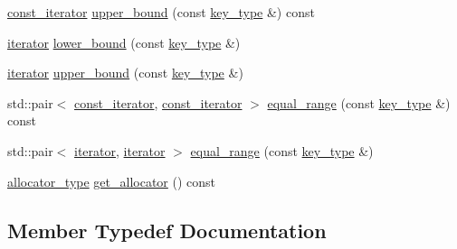 \begin{DoxyCompactItemize}
\item 
\hyperlink{classnifty_1_1container_1_1FlatSet_a0f4cd26da060859b18742abfd534aa24}{const\+\_\+iterator} \hyperlink{classnifty_1_1container_1_1FlatSet_a24a2ea880e091cadf42459203fa1b933}{upper\+\_\+bound} (const \hyperlink{classnifty_1_1container_1_1FlatSet_a0101a4574052389646be8d9bf092a949}{key\+\_\+type} \&) const 
\item 
\hyperlink{classnifty_1_1container_1_1FlatSet_a9c7fd20cd6b1878ccb8a7e068072c795}{iterator} \hyperlink{classnifty_1_1container_1_1FlatSet_a824de5a2d87a1d938af264a8e06c4a2a}{lower\+\_\+bound} (const \hyperlink{classnifty_1_1container_1_1FlatSet_a0101a4574052389646be8d9bf092a949}{key\+\_\+type} \&)
\item 
\hyperlink{classnifty_1_1container_1_1FlatSet_a9c7fd20cd6b1878ccb8a7e068072c795}{iterator} \hyperlink{classnifty_1_1container_1_1FlatSet_ad29a9db87f15925db9d5569482720b5b}{upper\+\_\+bound} (const \hyperlink{classnifty_1_1container_1_1FlatSet_a0101a4574052389646be8d9bf092a949}{key\+\_\+type} \&)
\item 
std\+::pair$<$ \hyperlink{classnifty_1_1container_1_1FlatSet_a0f4cd26da060859b18742abfd534aa24}{const\+\_\+iterator}, \hyperlink{classnifty_1_1container_1_1FlatSet_a0f4cd26da060859b18742abfd534aa24}{const\+\_\+iterator} $>$ \hyperlink{classnifty_1_1container_1_1FlatSet_a93b713a32fc6dd6e1fbf69b34849b314}{equal\+\_\+range} (const \hyperlink{classnifty_1_1container_1_1FlatSet_a0101a4574052389646be8d9bf092a949}{key\+\_\+type} \&) const 
\item 
std\+::pair$<$ \hyperlink{classnifty_1_1container_1_1FlatSet_a9c7fd20cd6b1878ccb8a7e068072c795}{iterator}, \hyperlink{classnifty_1_1container_1_1FlatSet_a9c7fd20cd6b1878ccb8a7e068072c795}{iterator} $>$ \hyperlink{classnifty_1_1container_1_1FlatSet_a777b777d0e79a499a72661e62fabc903}{equal\+\_\+range} (const \hyperlink{classnifty_1_1container_1_1FlatSet_a0101a4574052389646be8d9bf092a949}{key\+\_\+type} \&)
\item 
\hyperlink{classnifty_1_1container_1_1FlatSet_aafc00d7d957c81f01ee8cd5dcabb4c78}{allocator\+\_\+type} \hyperlink{classnifty_1_1container_1_1FlatSet_a2c4f4a7a77965f3c272231b6970d385f}{get\+\_\+allocator} () const 
\end{DoxyCompactItemize}


\subsection{Member Typedef Documentation}
\hypertarget{classnifty_1_1container_1_1FlatSet_aafc00d7d957c81f01ee8cd5dcabb4c78}{}
